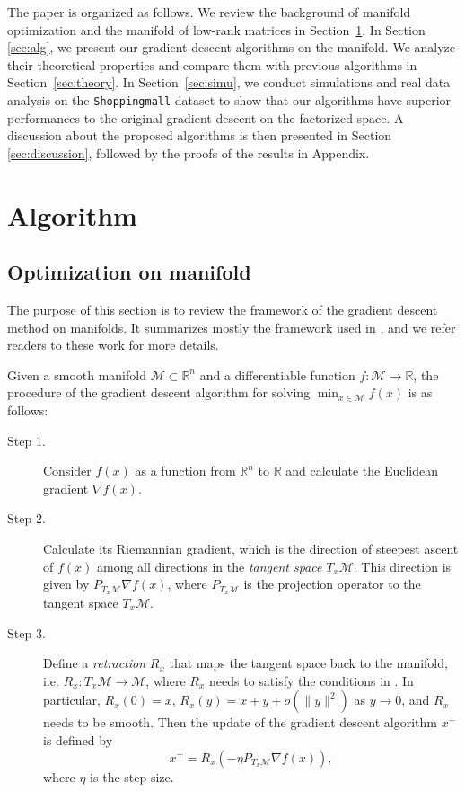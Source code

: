 \documentclass[12pt]{article}
\newcommand{\grad}{\nabla}
\def\reals{\mathbb{R}}
\def\calM{\mathcal{M}}
\theoremstyle{plain}
\theoremstyle{definition}
\theoremstyle{plain}
\theoremstyle{plain}
\theoremstyle{remark}
\begin{document}
The paper is organized as follows. We review the background of manifold optimization and the manifold of low-rank matrices in Section~\ref{sec:review_algo}. In Section \ref{sec:alg}, we present our gradient descent algorithms on the manifold. We analyze their theoretical properties and compare them with previous algorithms in Section~\ref{sec:theory}.  In Section~\ref{sec:simu}, we conduct simulations and real data analysis on the  \texttt{Shoppingmall} dataset to show that our algorithms have superior performances to the original gradient descent on the factorized space. A discussion about the proposed algorithms is then presented in Section \ref{sec:discussion}, followed by the proofs of the results in Appendix. 

\section{Algorithm}\label{sec:review_algo}
\subsection{Optimization on manifold}\label{sec:background}
The purpose of this section is to review the framework of  the gradient descent method on manifolds. It summarizes mostly the framework used in \cite{Vandereycken2013,Shalit:2012:OLE:2503308.2188399,absil2009optimization}, and we refer  readers to these work for more details.

Given a smooth manifold $\calM\subset\reals^n$ and a differentiable function $f: \calM\rightarrow \reals$, the procedure of the gradient descent algorithm for solving $\min_{x\in\calM} f(x)$ is as follows:
\begin{description}

\item[Step 1.] Consider $f(x)$ as a function from $\reals^n$ to $\reals$ and calculate the Euclidean gradient $\grad f(x)$.

\item[Step 2.] Calculate its Riemannian gradient, which is the direction of steepest ascent of $f(x)$ among all directions in the \textit{tangent space} $T_x\calM$. This direction is given by $P_{T_x\calM}\grad f(x)$, where $P_{T_x\calM}$ is the projection operator to the tangent space $T_x\calM$.

\item[Step 3.]  Define a \textit{retraction} $R_x$ that maps the tangent space back to the manifold, i.e. $R_x: T_x\calM\rightarrow \calM$, where $R_x$ needs to satisfy the conditions in \cite[Definition 2.2]{Vandereycken2013}. In particular, $R_x(0)=x$, $R_x(y)=x+y+o(\|y\|^2)$ as $y\rightarrow 0$, and $R_x$ needs to be smooth. Then the update of the gradient descent algorithm $x^+$ is defined by
\begin{equation}\label{eq:gradient_manifold}
x^+=R_x(-\eta P_{T_x\calM}\grad f(x)),
\end{equation}
where $\eta$ is the step size. 
\end{description}
\end{document}
